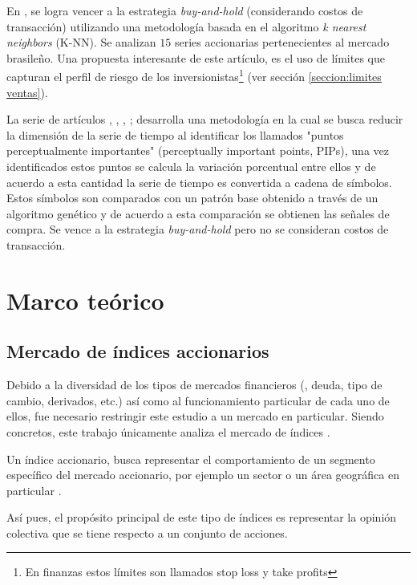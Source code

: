 \documentclass[12pt]{scrbook}
\theoremstyle{break}
\theoremstyle{break}
\newcommand{\buyhold}{\textit{buy-and-hold} }
\begin{document}
En \cite{Teixeira2010}, se logra vencer a la estrategia \buyhold (considerando costos de transacción) utilizando una metodología basada en el algoritmo \textit{k nearest neighbors} (K-NN). Se analizan $15$ series accionarias pertenecientes al mercado brasileño. Una propuesta interesante de este artículo, es el uso de límites que capturan el perfil de riesgo de los inversionistas\footnote{En finanzas estos límites son llamados stop loss y take profits} (ver sección \ref{seccion:limites ventas}).



La serie de artículos \cite{Canelas2012-gecco}, \cite{Canelas2013-gecco}, \cite{Canelas2013-journal}, \cite{Leitao2016}; desarrolla una metodología en la cual se busca reducir la dimensión de la serie de tiempo al identificar los llamados "puntos perceptualmente importantes" (perceptually important points, PIPs), una vez identificados estos puntos se calcula la variación porcentual entre ellos y de acuerdo a esta cantidad la serie de tiempo es convertida a cadena de símbolos. Estos símbolos son comparados con un patrón base obtenido a través de un algoritmo genético y de acuerdo a esta comparación se obtienen las señales de compra. Se vence a la estrategia \buyhold pero no se consideran costos de transacción.

\chapter{Marco teórico}
\label{capitulo:marco teorico}

\section{Mercado de índices accionarios}
\label{seccion:indices accionarios}

Debido a la diversidad de los tipos de mercados financieros (, deuda, tipo de cambio, derivados, etc.) así como al funcionamiento particular de cada uno de ellos, fue necesario restringir este estudio a un mercado en particular. Siendo concretos, este trabajo únicamente analiza el mercado de índices .

Un índice accionario, busca representar el comportamiento de un segmento específico del mercado accionario, por ejemplo un sector o un área geográfica en particular \cite{CFA2019-market-index}.

Así pues, el propósito principal de este tipo de índices es representar la opinión colectiva que se tiene respecto a un conjunto de acciones.
\end{document}
